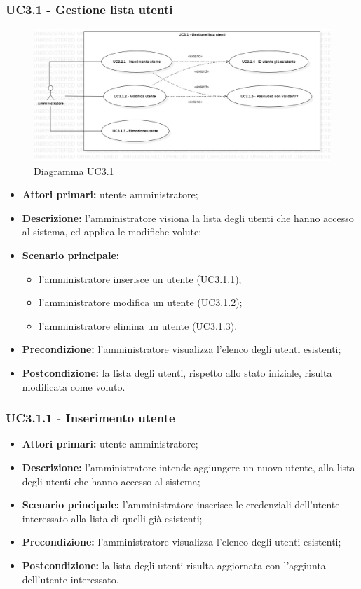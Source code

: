 \subsubsection{UC3.1 - Gestione lista utenti}
	\begin{center}
		\begin{figure}[h!]
			\includegraphics[width=15cm]{images/uc3.1.jpg}
			\caption{Diagramma UC3.1}
		\end{figure}
	\end{center}
	\begin{itemize}
		\item \textbf{Attori primari:} utente amministratore;
		\item \textbf{Descrizione:} l'amministratore visiona la lista degli utenti che hanno accesso al sistema, ed applica le modifiche volute;
		\item \textbf{Scenario principale:} 
			\begin{itemize}
				\item l'amministratore inserisce un utente (UC3.1.1);
				\item l'amministratore modifica un utente (UC3.1.2);
				\item l'amministratore elimina un utente (UC3.1.3).
			\end{itemize}
		\item \textbf{Precondizione:} l'amministratore visualizza l'elenco degli utenti esistenti;
		\item \textbf{Postcondizione:} la lista degli utenti, rispetto allo stato iniziale, risulta modificata come voluto.
	\end{itemize}

\subsubsection{UC3.1.1 - Inserimento utente}
\begin{itemize}
	\item \textbf{Attori primari:} utente amministratore;
	\item \textbf{Descrizione:} l'amministratore intende aggiungere un nuovo utente, alla lista degli utenti che hanno accesso al sistema;
	\item \textbf{Scenario principale:} l'amministratore inserisce le credenziali dell'utente interessato alla lista di quelli già esistenti;
	\item \textbf{Precondizione:} l'amministratore visualizza l'elenco degli utenti esistenti;
	\item \textbf{Postcondizione:} la lista degli utenti risulta aggiornata con l'aggiunta dell'utente interessato.
\end{itemize}

